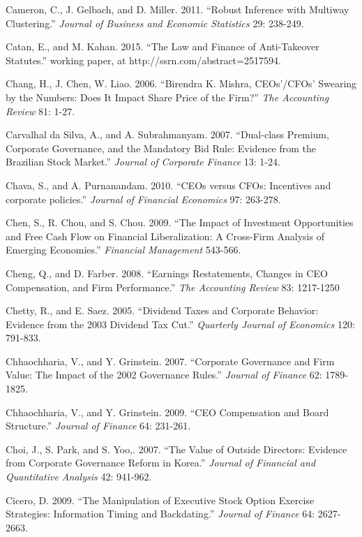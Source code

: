 \noindent Cameron, C., J. Gelbach, and D. Miller. 2011. ``Robust Inference with Multiway Clustering.''  \textit{Journal of Business and Economic Statistics} 29: 238-249.

\noindent Catan, E., and M. Kahan. 2015.  ``The Law and Finance of Anti-Takeover Statutes.'' working paper, at http://ssrn.com/abstract=2517594.

\noindent Chang, H., J. Chen, W. Liao. 2006. ``Birendra K. Mishra, CEOs'/CFOs' Swearing by the Numbers: Does It Impact Share Price of the Firm?''  \textit{The Accounting Review} 81: 1-27.

\noindent Carvalhal da Silva, A., and A. Subrahmanyam. 2007. ``Dual-class Premium, Corporate Governance, and the Mandatory Bid Rule:  Evidence from the Brazilian Stock Market.''  \textit{Journal of Corporate Finance} 13: 1-24.

\noindent Chava, S., and A. Purnanandam. 2010. ``CEOs versus CFOs: Incentives and corporate policies.''\textit{ Journal of Financial Economics }97: 263-278.\textit{}

\noindent Chen, S., R. Chou, and S. Chou. 2009. ``The Impact of Investment Opportunities and Free Cash Flow on Financial Liberalization: A Cross-Firm Analysis of Emerging Economies.'' \textit{Financial Management} 543-566.

\noindent Cheng, Q., and D. Farber. 2008. ``Earnings Restatements, Changes in CEO Compensation, and Firm Performance.''  \textit{The Accounting Review} 83: 1217-1250

\noindent Chetty, R., and E. Saez. 2005. ``Dividend Taxes and Corporate Behavior: Evidence from the 2003 Dividend Tax Cut.''  \textit{Quarterly Journal of Economics} 120: 791-833.

\noindent Chhaochharia, V., and Y. Grinstein. 2007. ``Corporate Governance and Firm Value: The Impact of the 2002 Governance Rules.''  \textit{Journal of Finance} 62: 1789-1825. 

\noindent Chhaochharia, V., and Y. Grinstein. 2009. ``CEO Compensation and Board Structure.''  \textit{Journal of Finance} 64: 231-261.

\noindent Choi, J., S. Park, and S. Yoo,. 2007. ``The Value of Outside Directors:  Evidence from Corporate Governance Reform in Korea.''  \textit{Journal of Financial and Quantitative Analysis} 42: 941-962.

\noindent Cicero, D. 2009. ``The Manipulation of Executive Stock Option Exercise Strategies: Information Timing and Backdating.''  \textit{Journal of Finance }64:\textit{ }2627-2663.

